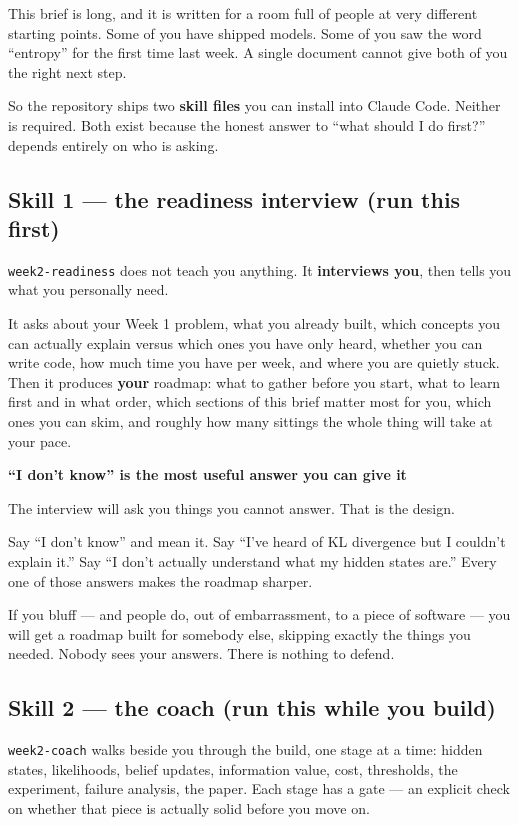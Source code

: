 \documentclass[11pt,a4paper]{article}
\newcommand{\boxtitle}[1]{{\bfseries #1}\par\vspace{2pt}}
\begin{document}
This brief is long, and it is written for a room full of people at very different starting points.
Some of you have shipped models. Some of you saw the word ``entropy'' for the first time last
week. A single document cannot give both of you the right next step.

So the repository ships two \textbf{skill files} you can install into Claude Code. Neither is
required. Both exist because the honest answer to ``what should I do first?'' depends entirely
on who is asking.

\subsection{Skill 1 --- the readiness interview (run this first)}

\texttt{week2-readiness} does not teach you anything. It \textbf{interviews you}, then tells you
what you personally need.

It asks about your Week 1 problem, what you already built, which concepts you can actually
explain versus which ones you have only heard, whether you can write code, how much time you
have per week, and where you are quietly stuck. Then it produces \textbf{your} roadmap: what to
gather before you start, what to learn first and in what order, which sections of this brief
matter most for you, which ones you can skim, and roughly how many sittings the whole thing will
take at your pace.

\begin{sbbox}
\boxtitle{``I don't know'' is the most useful answer you can give it}
The interview will ask you things you cannot answer. That is the design.

Say ``I don't know'' and mean it. Say ``I've heard of KL divergence but I couldn't explain it.''
Say ``I don't actually understand what my hidden states are.'' Every one of those answers makes
the roadmap sharper.

If you bluff --- and people do, out of embarrassment, to a piece of software --- you will get a
roadmap built for somebody else, skipping exactly the things you needed. Nobody sees your answers.
There is nothing to defend.
\end{sbbox}

\subsection{Skill 2 --- the coach (run this while you build)}

\texttt{week2-coach} walks beside you through the build, one stage at a time: hidden states,
likelihoods, belief updates, information value, cost, thresholds, the experiment, failure
analysis, the paper. Each stage has a gate --- an explicit check on whether that piece is
actually solid before you move on.
\end{document}

